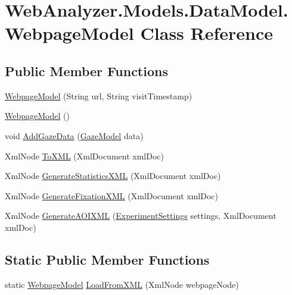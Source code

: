 \hypertarget{class_web_analyzer_1_1_models_1_1_data_model_1_1_webpage_model}{}\section{Web\+Analyzer.\+Models.\+Data\+Model.\+Webpage\+Model Class Reference}
\label{class_web_analyzer_1_1_models_1_1_data_model_1_1_webpage_model}
\subsection*{Public Member Functions}
\begin{DoxyCompactItemize}
\item 
\hyperlink{class_web_analyzer_1_1_models_1_1_data_model_1_1_webpage_model_ae5054b6875654937144914f592802d9d}{Webpage\+Model} (String url, String visit\+Timestamp)
\item 
\hyperlink{class_web_analyzer_1_1_models_1_1_data_model_1_1_webpage_model_a613cfd755d739701df6cd2b05190d72f}{Webpage\+Model} ()
\item 
void \hyperlink{class_web_analyzer_1_1_models_1_1_data_model_1_1_webpage_model_a7169078e11bdd8867dc0f507c9a65b9e}{Add\+Gaze\+Data} (\hyperlink{class_web_analyzer_1_1_models_1_1_data_model_1_1_gaze_model}{Gaze\+Model} data)
\item 
Xml\+Node \hyperlink{class_web_analyzer_1_1_models_1_1_data_model_1_1_webpage_model_a056bc9895b2a1c83631c24d100353ef2}{To\+X\+M\+L} (Xml\+Document xml\+Doc)
\item 
Xml\+Node \hyperlink{class_web_analyzer_1_1_models_1_1_data_model_1_1_webpage_model_a70651a677fea2ee273511ee0205c1885}{Generate\+Statistics\+X\+M\+L} (Xml\+Document xml\+Doc)
\item 
Xml\+Node \hyperlink{class_web_analyzer_1_1_models_1_1_data_model_1_1_webpage_model_a052f46e1ae62f68e632423a266a1d15e}{Generate\+Fixation\+X\+M\+L} (Xml\+Document xml\+Doc)
\item 
Xml\+Node \hyperlink{class_web_analyzer_1_1_models_1_1_data_model_1_1_webpage_model_a1c5db01c5ea35dbe8336096cd250bc2d}{Generate\+A\+O\+I\+X\+M\+L} (\hyperlink{class_web_analyzer_1_1_models_1_1_settings_model_1_1_experiment_settings}{Experiment\+Settings} settings, Xml\+Document xml\+Doc)
\end{DoxyCompactItemize}
\subsection*{Static Public Member Functions}
\begin{DoxyCompactItemize}
\item 
static \hyperlink{class_web_analyzer_1_1_models_1_1_data_model_1_1_webpage_model}{Webpage\+Model} \hyperlink{class_web_analyzer_1_1_models_1_1_data_model_1_1_webpage_model_a26999baeddbe48b5c6f10a0b7510c807}{Load\+From\+X\+M\+L} (Xml\+Node webpage\+Node)
\end{DoxyCompactItemize}
